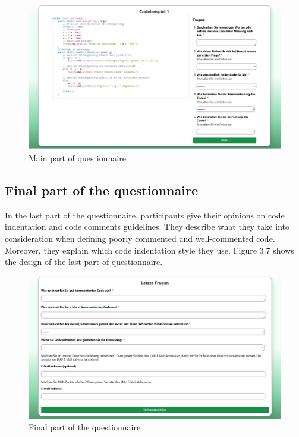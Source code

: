 \begin{figure} [H]
  \centering
  \includegraphics[scale=0.40]{figures/main_p.png}
  \caption{Main part of questionnaire}
  \label{fig:AnhangsChor}
\end{figure}



\subsection{Final part of the questionnaire}
In the last part of the questionnaire, participants give their opinions on code indentation and code comments guidelines. They describe what they take into consideration when defining poorly commented and well-commented code. Moreover, they explain which code indentation style they use.  Figure 3.7 shows the design of the last part of questionnaire.


\begin{figure}  [H]
  \centering
  \includegraphics[scale=0.40]{figures/last_part.png}
  \caption{Final part of the questionnaire}
  \label{fig:AnhangsChor}
\end{figure}


